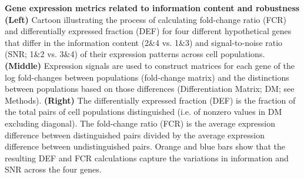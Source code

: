 \textbf{Gene expression metrics related to information content and robustness} \textbf{(Left)} Cartoon illustrating the process of calculating fold-change ratio (FCR) and differentially expressed fraction (DEF) for four different hypothetical genes that differ in the information content (2\&4 vs. 1\&3) and signal-to-noise ratio (SNR; 1\&2 vs. 3\&4) of their expression patterns across cell populations. \textbf{(Middle)} Expression signals are used to construct matrices for each gene of the log fold-changes between populations (fold-change matrix) and the distinctions between populations based on those differences (Differentiation Matrix; DM; see Methods). \textbf{(Right)} The differentially expressed fraction (DEF) is the fraction of the total pairs of cell populations distinguished (i.e. of nonzero values in DM excluding diagonal). The fold-change ratio (FCR) is the average expression difference between distinguished pairs divided by the average expression difference between undistinguished pairs. Orange and blue bars show that the resulting DEF and FCR calculations capture the variations in information and SNR across the four genes.